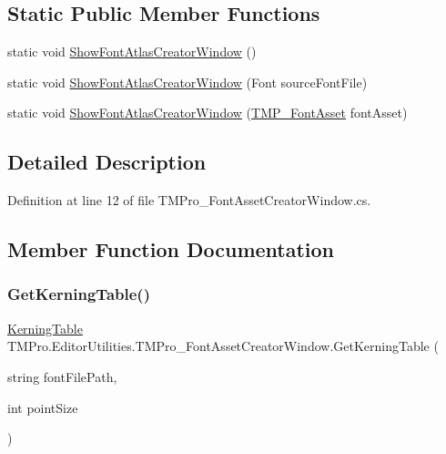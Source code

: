 \subsection*{Static Public Member Functions}
\begin{DoxyCompactItemize}
\item 
static void \mbox{\hyperlink{class_t_m_pro_1_1_editor_utilities_1_1_t_m_pro___font_asset_creator_window_add90ea25a2962e0e7bd63e59da7e7cef}{Show\+Font\+Atlas\+Creator\+Window}} ()
\item 
static void \mbox{\hyperlink{class_t_m_pro_1_1_editor_utilities_1_1_t_m_pro___font_asset_creator_window_a63ba434b610962d8eedccc61306ecc2d}{Show\+Font\+Atlas\+Creator\+Window}} (Font source\+Font\+File)
\item 
static void \mbox{\hyperlink{class_t_m_pro_1_1_editor_utilities_1_1_t_m_pro___font_asset_creator_window_a9e0ed45f56fa9d4b78c563be37ad3106}{Show\+Font\+Atlas\+Creator\+Window}} (\mbox{\hyperlink{class_t_m_pro_1_1_t_m_p___font_asset}{T\+M\+P\+\_\+\+Font\+Asset}} font\+Asset)
\end{DoxyCompactItemize}


\subsection{Detailed Description}


Definition at line 12 of file T\+M\+Pro\+\_\+\+Font\+Asset\+Creator\+Window.\+cs.



\subsection{Member Function Documentation}
\mbox{\label{class_t_m_pro_1_1_editor_utilities_1_1_t_m_pro___font_asset_creator_window_a2bb78015866feff6586b41f196d77e75}} 
\subsubsection{\texorpdfstring{GetKerningTable()}{GetKerningTable()}}
{\footnotesize\ttfamily \mbox{\hyperlink{class_t_m_pro_1_1_kerning_table}{Kerning\+Table}} T\+M\+Pro.\+Editor\+Utilities.\+T\+M\+Pro\+\_\+\+Font\+Asset\+Creator\+Window.\+Get\+Kerning\+Table (\begin{DoxyParamCaption}\item[{string}]{font\+File\+Path,  }\item[{int}]{point\+Size }\end{DoxyParamCaption})}



